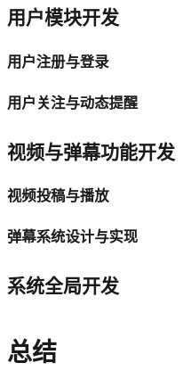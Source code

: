 \subsection{用户模块开发}

\subsubsection{用户注册与登录}

\subsubsection{用户关注与动态提醒}

\subsection{视频与弹幕功能开发}

\subsubsection{视频投稿与播放}

\subsubsection{弹幕系统设计与实现}

\subsection{系统全局开发}

\newpage

\section{总结}

\newpage

